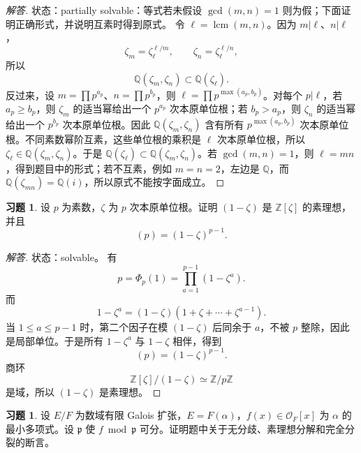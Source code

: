 \documentclass[11pt,a4paper,openany]{ctexbook}
\numberwithin{equation}{chapter}
\newcommand{\Q}{\mathbb{Q}}
\newcommand{\Z}{\mathbb{Z}}
\newcommand{\OF}{\mathcal{O}_F}
\theoremstyle{plain}
\theoremstyle{definition}
\newtheorem{exercise}[theorem]{习题}
\theoremstyle{remark}
\begin{document}
\begin{proof}[解答]
状态：partially solvable：等式若未假设 $\gcd(m,n)=1$ 则为假；下面证明正确形式，并说明互素时得到原式。
令 $\ell=\operatorname{lcm}(m,n)$。因为 $m|\ell$、$n|\ell$，
\[
\zeta_m=\zeta_\ell^{\ell/m},\qquad
\zeta_n=\zeta_\ell^{\ell/n},
\]
所以
\[
\Q(\zeta_m,\zeta_n)\subset\Q(\zeta_\ell).
\]
反过来，设 $m=\prod p^{a_p}$、$n=\prod p^{b_p}$，则
$\ell=\prod p^{\max(a_p,b_p)}$。对每个 $p|\ell$，若 $a_p\ge b_p$，则
$\zeta_m$ 的适当幂给出一个 $p^{a_p}$ 次本原单位根；若 $b_p>a_p$，则
$\zeta_n$ 的适当幂给出一个 $p^{b_p}$ 次本原单位根。因此
$\Q(\zeta_m,\zeta_n)$ 含有所有 $p^{\max(a_p,b_p)}$ 次本原单位根。不同素数幂阶互素，这些单位根的乘积是 $\ell$ 次本原单位根，所以
$\zeta_\ell\in\Q(\zeta_m,\zeta_n)$。于是
$\Q(\zeta_\ell)\subset\Q(\zeta_m,\zeta_n)$。若 $\gcd(m,n)=1$，则 $\ell=mn$，得到题目中的形式；若不互素，例如 $m=n=2$，左边是 $\Q$，而
$\Q(\zeta_{mn})=\Q(i)$，所以原式不能按字面成立。
\end{proof}

\begin{exercise}
设 $p$ 为素数，$\zeta$ 为 $p$ 次本原单位根。证明 $(1-\zeta)$ 是 $\Z[\zeta]$ 的素理想，并且
\[
(p)=(1-\zeta)^{p-1}.
\]
\end{exercise}

\begin{proof}[解答]
状态：solvable。
有
\[
p=\Phi_p(1)=\prod_{a=1}^{p-1}(1-\zeta^a).
\]
而
\[
1-\zeta^a=(1-\zeta)(1+\zeta+\cdots+\zeta^{a-1}).
\]
当 $1\le a\le p-1$ 时，第二个因子在模 $(1-\zeta)$ 后同余于 $a$，不被 $p$ 整除，因此是局部单位。于是所有 $1-\zeta^a$ 与 $1-\zeta$ 相伴，得到
\[
(p)=(1-\zeta)^{p-1}.
\]
商环
\[
\Z[\zeta]/(1-\zeta)\simeq\Z/p\Z
\]
是域，所以 $(1-\zeta)$ 是素理想。
\end{proof}

\begin{exercise}
设 $E/F$ 为数域有限 Galois 扩张，$E=F(\alpha)$，$f(x)\in\OF[x]$ 为 $\alpha$ 的最小多项式。设 $\mathfrak p$ 使 $f\bmod\mathfrak p$ 可分。证明题中关于无分歧、素理想分解和完全分裂的断言。
\end{exercise}
\end{document}
